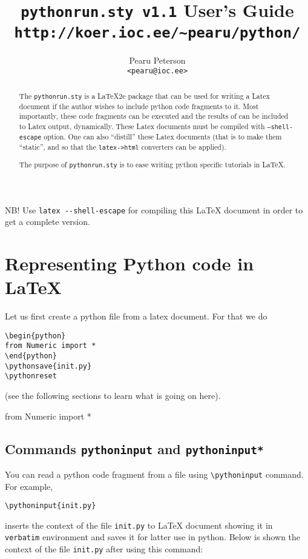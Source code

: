 \documentclass[a4paper,12pt]{article}
\title{\texttt{pythonrun.sty v1.1} User's Guide\\
\texttt{\normalsize http://koer.ioc.ee/\~{}pearu/python/}}
\author{Pearu Peterson\\\texttt{\normalsize<pearu@ioc.ee>}}
\newcommand{\bs}{\symbol{`\\}}
\begin{document}
\maketitle

\begin{abstract}
  The \texttt{pythonrun.sty} is a LaTeX2e package that can be used for
  writing a Latex document if the author wishes to include python code
  fragments to it. Most importantly, these code fragments can be
  executed and the results of can be included to Latex output,
  dynamically. These Latex documents must be compiled with
  \texttt{--shell-escape} option. One can also ``distill'' these Latex
  documents (that is to make them ``static'', and so that the
  \texttt{latex->html}  converters can be applied).
  
  The purpose of \texttt{pythonrun.sty} is to ease writing python
  specific tutorials in LaTeX.
\end{abstract}
\ifpythondistil\else
\ifshellescape\else
\begin{center}
\large NB! Use \verb+latex --shell-escape+ for compiling this LaTeX
document in order to get a complete version.  
\end{center}
\fi\fi

\tableofcontents


\section{Representing Python code in LaTeX}
\label{sec:repr-pyth-code}

Let us first create a python file from a latex document. For that we do
\begin{verbatim}
\begin{python}
from Numeric import *
\end{python}
\pythonsave{init.py}
\pythonreset
\end{verbatim}
(see the following sections to learn what is going on here).
\begin{python}
from Numeric import *
\end{python}
\pythonreset

\subsection{Commands \texttt{\bs pythoninput} and \texttt{\bs pythoninput*}}

You can read a python code fragment from a file using \verb+\pythoninput+ 
command. For example, 
\begin{verbatim}
\pythoninput{init.py}
\end{verbatim}
inserts the context of the file \verb+init.py+ to LaTeX document
showing it in \verb+verbatim+ environment and saves it for latter use
in python. Below is shown the context
of the file \verb+init.py+ after using this command:%
\end{document}
